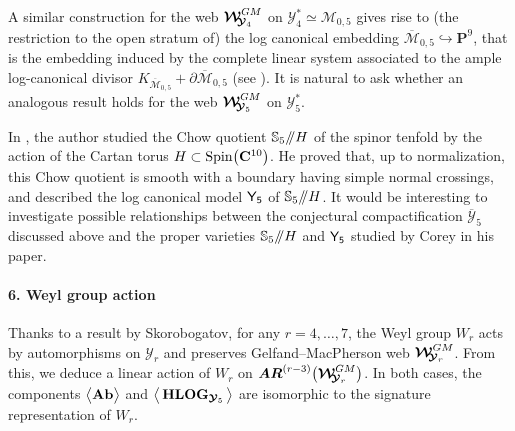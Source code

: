 \documentclass[11pt]{amsart}
\newcommand{\mk}{\medskip}
\begin{document}
A similar construction for the web $\boldsymbol{\mathcal W}_{\hspace{-0.1cm} \boldsymbol{\mathcal Y}_4}^{GM}$ on $\boldsymbol{\mathcal Y}_4^*\simeq \mathcal M_{0,5}$ gives rise to (the restriction to the open stratum of) the log canonical embedding $\overline{\mathcal M}_{0,5}\hookrightarrow \mathbf P^{9}$, that is the embedding induced
by the complete linear system associated to the ample log-canonical divisor $K_{\overline{\mathcal M}_{0,5}}  +\partial \overline{\mathcal M}_{0,5}$ (see \cite{KeelTevelev}). It is natural to ask whether an analogous result holds for the web $\boldsymbol{\mathcal W}_{\hspace{-0.1cm} \boldsymbol{\mathcal Y}_5}^{GM}$
on $\boldsymbol{\mathcal Y}_5^*$.


 In \cite{Corey}, the author studied the Chow quotient $\mathbb S_5/\hspace{-0.1cm}/ H$ of the spinor tenfold by the action of the Cartan torus $H\subset {\rm Spin}\big(\mathbf C^{10}\big)$.  He proved that, up to normalization, this Chow quotient is  smooth with a boundary having simple normal crossings, and described the log canonical model $\sf Y_5$ of $\mathbb S_5/\hspace{-0.1cm}/ H$.   It would be interesting to investigate possible relationships between the conjectural compactification $\overline{\boldsymbol{\mathcal Y}}_5$  discussed above and the proper varieties $\mathbb S_5/\hspace{-0.1cm}/ H$  and $\sf Y_5$  studied by Corey in his paper.
\mk 

\paragraph{\bf 6. Weyl group action}
Thanks to a result by Skorobogatov, for any $r=4,\ldots,7$, the Weyl group $W_{r}$ acts by automorphisms on $\boldsymbol{\mathcal Y}_r$ and preserves Gelfand--MacPherson web $\boldsymbol{\mathcal W}_{\hspace{-0.1cm} \boldsymbol{\mathcal Y}_r}^{GM}$.  From this, we deduce a linear action of $W_r$ on $\boldsymbol{AR}^{(r-3)}\big(  \boldsymbol{\mathcal W}_{\hspace{-0.1cm} \boldsymbol{\mathcal Y}_r}^{GM}\big) $. 
In both cases, the components 
$\big\langle 
\boldsymbol{\bf Ab} 
\big\rangle$ and  $\big\langle \,
{\bf HLOG}_{\boldsymbol{\mathcal Y}_5} \,
\big\rangle$
are isomorphic to the signature representation of $W_r$.
\mk
\end{document}
